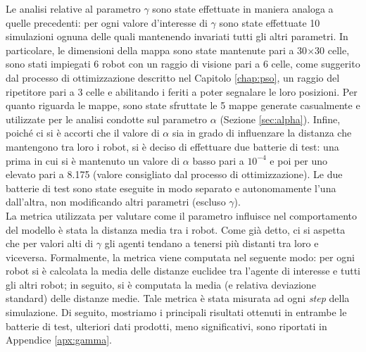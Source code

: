 Le analisi relative al parametro $\gamma$ sono state effettuate in maniera analoga a quelle precedenti: per ogni valore d'interesse di $\gamma$ sono state effettuate 10 simulazioni ognuna delle quali mantenendo invariati tutti gli altri parametri.
In particolare, le dimensioni della mappa sono state mantenute pari a 30$\times$30 celle, sono stati impiegati 6 robot con un raggio di visione pari a 6 celle, come suggerito dal processo di ottimizzazione descritto nel Capitolo \ref{chap:pso}, un raggio del ripetitore pari a 3 celle e abilitando i feriti a poter segnalare le loro posizioni.
Per quanto riguarda le mappe, sono state sfruttate le 5 mappe generate casualmente e utilizzate per le analisi condotte sul parametro $\alpha$ (Sezione \ref{sec:alpha}).
Infine, poiché ci si è accorti che il valore di $\alpha$ sia in grado di influenzare la distanza che mantengono tra loro i robot, si è deciso di effettuare due batterie di test: una prima in cui si è mantenuto un valore di $\alpha$ basso pari a $10^{-4}$ e poi per uno elevato pari a 8.175 (valore consigliato dal processo di ottimizzazione).
Le due batterie di test sono state eseguite in modo separato e autonomamente l'una dall'altra, non modificando altri parametri (escluso $\gamma$).\\
La metrica utilizzata per valutare come il parametro influisce nel comportamento del modello è stata la distanza media tra i robot. Come già detto, ci si aspetta che per valori alti di $\gamma$ gli agenti tendano a tenersi più distanti tra loro e viceversa.
Formalmente, la metrica viene computata nel seguente modo: per ogni robot si è calcolata la media delle distanze euclidee tra l'agente di interesse e tutti gli altri robot; in seguito, si è computata la media (e relativa deviazione standard) delle distanze medie.
Tale metrica è stata misurata ad ogni \textit{step} della simulazione.
Di seguito, mostriamo i principali risultati ottenuti in entrambe le batterie di test, ulteriori dati prodotti, meno significativi, sono riportati in Appendice \ref{apx:gamma}.

